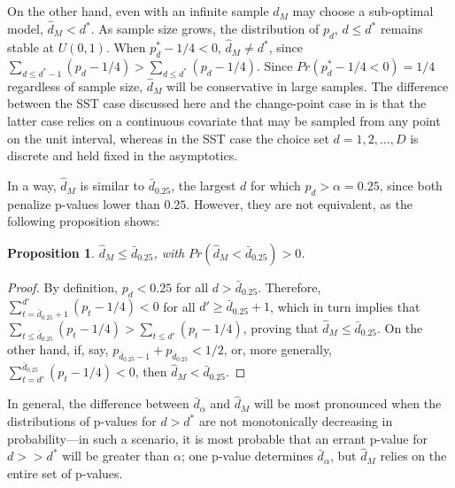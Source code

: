 \documentclass[sts]{imsart}\usepackage[]{graphicx}\usepackage[]{color}
\newcommand{\dalphaU}{\bar{d}_\alpha}
\newcommand{\dstar}{d^*}
\newcommand{\dhatU}{\bar{d}}
\newcommand{\dhatm}{\hat{d}_M}
\newtheorem{prop}{Proposition}
\begin{document}
On the other hand, even with an infinite sample $\dhatm$ may choose a
sub-optimal model, $\dhatm<\dstar$.
As sample size grows, the distribution of $p_d$, $d\le \dstar$ remains
stable at $U(0,1)$.
When $p_\dstar-1/4<0$, $\dhatm \neq \dstar$, since $\sum_{d\le
  \dstar-1} (p_d-1/4)>\sum_{d\le \dstar} (p_d-1/4)$.
Since $Pr(p_\dstar-1/4<0)=1/4$ regardless of sample size, $\dhatm$
will be conservative in large samples.
The difference between the SST case discussed here and the
change-point case in \citet{mallik} is that the latter case relies on
a continuous covariate that may be sampled from any point on the unit
interval, whereas in the SST case the choice set $d=1,2,\dots,D$ is
discrete and held fixed in the asymptotics.

In a way, $\dhatm$ is similar to $\dhatU_{0.25}$, the largest $d$ for
which $p_d>\alpha=0.25$, since both penalize p-values lower than
$0.25$.
However, they are not equivalent, as the following proposition shows:
\begin{prop}
$\dhatm \le \dhatU_{0.25}$, with $Pr(\dhatm < \dhatU_{0.25})>0$.
\end{prop}
\begin{proof}
By definition, $p_d<0.25$ for all $d>\dhatU_{0.25}$. Therefore,
$\sum_{t=\dhatU_{0.25}+1}^{d'}(p_t-1/4)<0$ for all $d'\ge
\dhatU_{0.25}+1$, which in turn implies that $\sum_{t\le
  \dhatU_{0.25}}(p_t-1/4)>\sum_{t\le d'}(p_t-1/4)$, proving that
$\dhatm\le \dhatU_{0.25}$. On the other hand, if, say,
$p_{\dhatU_{0.25}-1}+p_{\dhatU_{0.25}}<1/2$, or, more generally,
$\sum_{t=d'}^{\dhatU_{0.25}}(p_t-1/4)<0$, then $\dhatm<\dhatU_{0.25}$.
\end{proof}

In general, the difference between $\dalphaU$ and $\dhatm$ will be
most pronounced when the distributions of p-values for $d>\dstar$ are
not monotonically decreasing in probability---in such a scenario, it
is most probable that an errant p-value for $d>>\dstar$ will be
greater than $\alpha$; one p-value determines $\dalphaU$, but
$\dhatm$ relies on the entire set of p-values.
\end{document}
